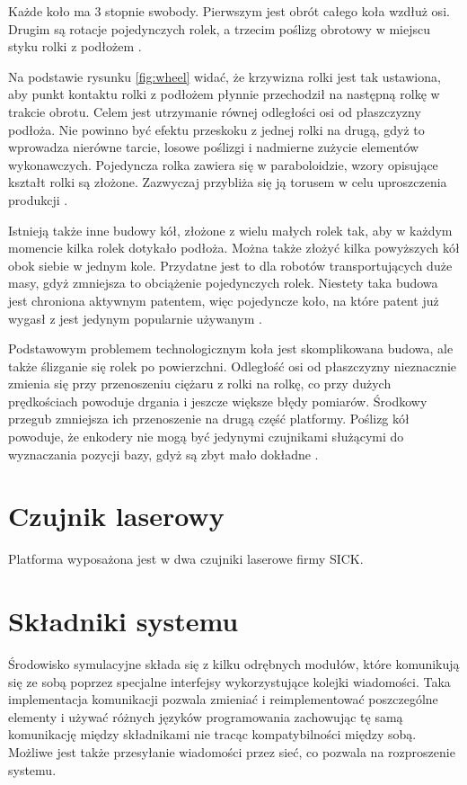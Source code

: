 Każde koło ma 3 stopnie swobody. Pierwszym jest obrót całego koła wzdłuż osi.
Drugim są rotacje pojedynczych rolek, a trzecim poślizg obrotowy w miejscu styku rolki z podłożem \cite{kinematic_modeling}.

Na podstawie rysunku \ref{fig:wheel} widać, że krzywizna rolki jest tak ustawiona, aby punkt kontaktu rolki z podłożem płynnie przechodził na następną rolkę w trakcie obrotu.
Celem jest utrzymanie równej odległości osi od płaszczyzny podłoża.
Nie powinno być efektu przeskoku z jednej rolki na drugą, gdyż to wprowadza nierówne tarcie, losowe poślizgi i nadmierne zużycie elementów wykonawczych.
Pojedyncza rolka zawiera się w paraboloidzie, wzory opisujące kształt rolki są złożone.
Zazwyczaj przybliża się ją torusem w celu uproszczenia produkcji \cite{rollers}.

Istnieją także inne budowy kół, złożone z wielu małych rolek tak, aby w każdym momencie kilka rolek dotykało podłoża.
Można także złożyć kilka powyższych kół obok siebie w jednym kole.
Przydatne jest to dla robotów transportujących duże masy, gdyż zmniejsza to obciążenie pojedynczych rolek.
Niestety taka budowa jest chroniona aktywnym patentem, więc pojedyncze koło, na które patent już wygasł z jest jedynym popularnie używanym \cite{paletobot}.

Podstawowym problemem technologicznym koła jest skomplikowana budowa, ale także ślizganie się rolek po powierzchni.
Odległość osi od płaszczyzny nieznacznie zmienia się przy przenoszeniu ciężaru z rolki na rolkę, co przy dużych prędkościach powoduje drgania i jeszcze większe błędy pomiarów.
Środkowy przegub zmniejsza ich przenoszenie na drugą część platformy.
Poślizg kół powoduje, że enkodery nie mogą być jedynymi czujnikami służącymi do wyznaczania pozycji bazy, gdyż są zbyt mało dokładne \cite{heavy}.

\section{Czujnik laserowy}
Platforma wyposażona jest w dwa czujniki laserowe firmy SICK.


\section{Składniki systemu}
Środowisko symulacyjne składa się z kilku odrębnych modułów, które komunikują się ze sobą poprzez specjalne interfejsy wykorzystujące kolejki wiadomości.
Taka implementacja komunikacji pozwala zmieniać i reimplementować poszczególne elementy i używać różnych języków programowania zachowując tę samą komunikację między składnikami nie tracąc kompatybilności między sobą.
Możliwe jest także przesyłanie wiadomości przez sieć, co pozwala na rozproszenie systemu.

